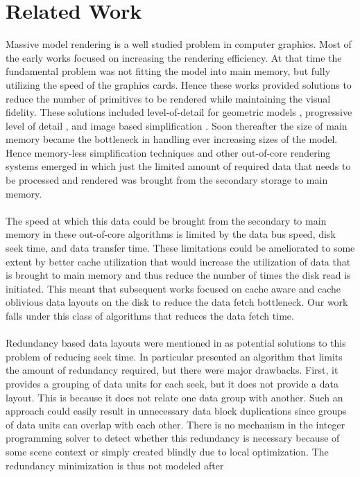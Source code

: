 \section{Related Work}
Massive model rendering is a well studied problem in computer graphics. Most of
the early works focused on increasing the rendering efficiency. At that time
the fundamental problem was not fitting the model into main memory, but
fully utilizing the speed of the graphics cards. Hence these works provided
solutions to reduce the number of primitives to be rendered while maintaining
the visual fidelity. These solutions included level-of-detail for geometric
models \cite{Luebke02}, progressive level of detail
\cite{Hoppe:98b,Hoppe:97,Hoppe:96,SG:01}, and image based simplification
\cite{ACWBZEHHSBWBM:99}. Soon thereafter the size of main memory became the
bottleneck in handling ever increasing sizes of the model. Hence memory-less
simplification techniques \cite{LT:99}  and other out-of-core rendering systems
\cite{Silva02,VM:02} emerged in which just the limited amount of required data
that needs to be processed and rendered was brought from the secondary storage
to main memory. \\
\\
The speed at which this data
could be brought from the secondary to main memory in these out-of-core
algorithms is limited by the data bus speed, disk seek time, and data transfer
time. These limitations could be ameliorated to some extent by
better cache utilization that would increase the utilization of data that is
brought to main memory and thus reduce the number of times the disk read is
initiated. This meant that subsequent works focused on cache aware
\cite{ssdpaper} and cache oblivious data layouts
\cite{cacheobliviouslayout,YOON:2006:MeshLayout} on the disk to reduce the
data fetch bottleneck. Our work falls under this class of algorithms that
reduces the data fetch time. \\
\\
Redundancy based data layouts were mentioned in
\cite{Patterson88,singleseeklayout,optimizingredundancy} as potential solutions
to this problem of reducing seek time. In particular
\cite{optimizingredundancy} presented an algorithm that limits the amount of
redundancy required, but there were major drawbacks. First, it provides a
grouping of data units for each seek, but it does not provide a data layout.
This is because it does not relate one data group with another.
Such an approach could easily result in unnecessary data
block duplications since groups of data units can overlap with each other. There is no mechanism in the integer programming solver to detect whether this redundancy is necessary because of some scene context or simply created blindly due to local optimization. The redundancy minimization is thus not modeled after
